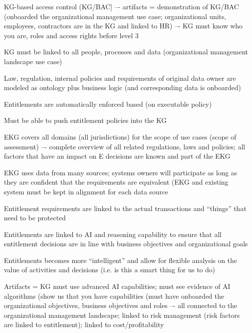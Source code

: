 \begin{members-only}
\begin{scoring}
    \item KG-based access control (KG/BAC] –- artifacts = demonstration of KG/BAC
          (onboarded the organizational management use case; organizational units, employees, contractors are in
          the KG and linked to HR) –- KG must know who you are, roles and access rights before level 3
    \item KG must be linked to all people, processes and data (organizational management landscape use case)
    \item Law, regulation, internal policies and requirements of original data owner are modeled as ontology
          plus business logic (and corresponding data is onboarded)
    \item Entitlements are automatically enforced based (on executable policy)
    \item Must be able to push entitlement policies into the KG
    \item EKG covers all domains (all jurisdictions) for the scope of use cases (scope of assessment) –-
          complete overview of all related regulations, laws and policies;
          all factors that have an impact on E decisions are known and part of the EKG
    \item EKG uses data from many sources; systems owners will participate as long as they are confident that
          the requirements are equivalent (EKG and existing system must be kept in alignment for each data source
    \item Entitlement requirements are linked to the actual transactions and “things” that need to be protected

\end{scoring}

\kgmmscoringlevelFour

\begin{scoring}

  \item Entitlements are linked to AI and reasoning capability to ensure that all entitlement decisions are
        in line with business objectives and organizational goals
  \item Entitlements becomes more “intelligent” and allow for flexible analysis on the value of
        activities and decisions (i.e. is this a smart thing for us to do)
  \item Artifacts = KG must use advanced AI capabilities; must see evidence of AI algorithms
        (show us that you have  capabilities (must have onboarded the organizational objectives,
        business objectives and roles –- all connected to the organizational management landscape;
        linked to risk management (risk factors are linked to entitlement); linked to cost/profitability


\end{scoring}
\end{members-only}
